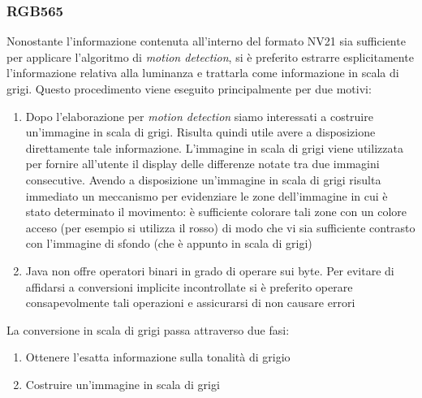 \subsubsection{RGB565}

Nonostante l'informazione contenuta all'interno del formato NV21 sia sufficiente per applicare l'algoritmo di \textit{motion detection}, si è preferito estrarre esplicitamente l'informazione relativa alla luminanza e trattarla come informazione in scala di grigi. Questo procedimento viene eseguito principalmente per due motivi:
\begin{enumerate}
  \item Dopo l'elaborazione per \textit{motion detection} siamo interessati a costruire un'immagine in scala di grigi. Risulta quindi utile avere a disposizione direttamente tale informazione. L'immagine in scala di grigi viene utilizzata per fornire all'utente il display delle differenze notate tra due immagini consecutive. Avendo a disposizione un'immagine in scala di grigi risulta immediato un meccanismo per evidenziare le zone dell'immagine in cui è stato determinato il movimento: è sufficiente colorare tali zone con un colore acceso (per esempio si utilizza il rosso) di modo che vi sia sufficiente contrasto con l'immagine di sfondo (che è appunto in scala di grigi)
  \item Java non offre operatori binari in grado di operare sui byte. Per evitare di affidarsi a conversioni implicite incontrollate si è preferito operare consapevolmente tali operazioni e assicurarsi di non causare errori
\end{enumerate}

La conversione in scala di grigi passa attraverso due fasi:
\begin{enumerate}
  \item Ottenere l'esatta informazione sulla tonalità di grigio
  \item Costruire un'immagine in scala di grigi
\end{enumerate}

